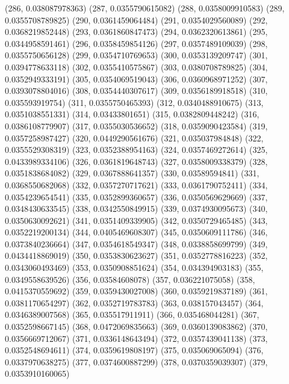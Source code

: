 {					(286, 0.038087978363)
					(287, 0.0355790615082)
					(288, 0.0358009910583)
					(289, 0.0355708789825)
					(290, 0.0361459064484)
					(291, 0.0354029560089)
					(292, 0.0368219852448)
					(293, 0.0361860847473)
					(294, 0.0362320613861)
					(295, 0.0344958591461)
					(296, 0.0358459854126)
					(297, 0.0357489109039)
					(298, 0.0355750656128)
					(299, 0.0354710769653)
					(300, 0.0353139209747)
					(301, 0.0394778633118)
					(302, 0.0355410575867)
					(303, 0.0380708789825)
					(304, 0.0352949333191)
					(305, 0.0354069519043)
					(306, 0.0360968971252)
					(307, 0.0393078804016)
					(308, 0.0354440307617)
					(309, 0.0356189918518)
					(310, 0.035593919754)
					(311, 0.0355750465393)
					(312, 0.0340488910675)
					(313, 0.0351038551331)
					(314, 0.03433801651)
					(315, 0.0382809448242)
					(316, 0.0386108779907)
					(317, 0.0355030536652)
					(318, 0.0359090423584)
					(319, 0.0357258987427)
					(320, 0.0449290561676)
					(321, 0.035037984848)
					(322, 0.0355529308319)
					(323, 0.0352388954163)
					(324, 0.0357469272614)
					(325, 0.0433989334106)
					(326, 0.0361819648743)
					(327, 0.0358009338379)
					(328, 0.0351838684082)
					(329, 0.0367888641357)
					(330, 0.03589594841)
					(331, 0.0368550682068)
					(332, 0.0357270717621)
					(333, 0.0361790752411)
					(334, 0.0354239654541)
					(335, 0.0352899360657)
					(336, 0.0350569629669)
					(337, 0.0348430633545)
					(338, 0.0342550849915)
					(339, 0.0374930095673)
					(340, 0.0350630092621)
					(341, 0.0351409339905)
					(342, 0.0350729465485)
					(343, 0.0352219200134)
					(344, 0.0405469608307)
					(345, 0.0350609111786)
					(346, 0.0373840236664)
					(347, 0.0354618549347)
					(348, 0.0338858699799)
					(349, 0.0434418869019)
					(350, 0.0353830623627)
					(351, 0.0352778816223)
					(352, 0.0343060493469)
					(353, 0.0350908851624)
					(354, 0.034394903183)
					(355, 0.0349558639526)
					(356, 0.03584608078)
					(357, 0.036221075058)
					(358, 0.0415370559692)
					(359, 0.0359430027008)
					(360, 0.0359219837189)
					(361, 0.0381170654297)
					(362, 0.0352719783783)
					(363, 0.038157043457)
					(364, 0.0346389007568)
					(365, 0.035517911911)
					(366, 0.035468044281)
					(367, 0.0352598667145)
					(368, 0.0472069835663)
					(369, 0.0360139083862)
					(370, 0.0356669712067)
					(371, 0.0336148643494)
					(372, 0.0357439041138)
					(373, 0.0352548694611)
					(374, 0.0359619808197)
					(375, 0.035069065094)
					(376, 0.0337970638275)
					(377, 0.0374600887299)
					(378, 0.0370359039307)
					(379, 0.0353910160065)
}
